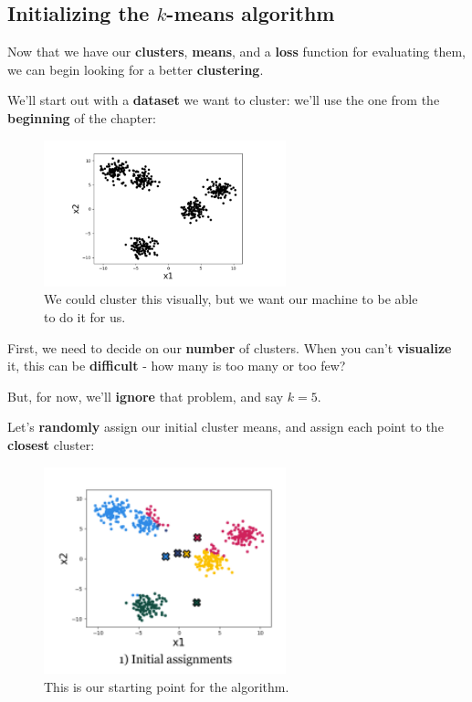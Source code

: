     \subsection{Initializing the $k$-means algorithm}
    
        Now that we have our \textbf{clusters}, \textbf{means}, and a \textbf{loss} function for evaluating them, we can begin looking for a better \textbf{clustering}.
        
        We'll start out with a \textbf{dataset} we want to cluster: we'll use the one from the \textbf{beginning} of the chapter:
        
        \begin{figure}[H]
            \centering
            \includegraphics[width=70mm,scale=0.4]{images/clustering_images/clustering_example.png}
            \caption*{We could cluster this visually, but we want our machine to be able to do it for us.}
        \end{figure}
        
        First, we need to decide on our \textbf{number} of clusters. When you can't \textbf{visualize} it, this can be \textbf{difficult} - how many is too many or too few? 
        
        But, for now, we'll \textbf{ignore} that problem, and say $k=5$. 
        
        Let's \textbf{randomly} assign our initial cluster means, and assign each point to the \textbf{closest} cluster:
        
        \begin{figure}[H]
            \centering
            \includegraphics[width=70mm,scale=0.4]{images/clustering_images/initialization_cluster.png}
            \caption*{This is our starting point for the algorithm.}
        \end{figure}
    
